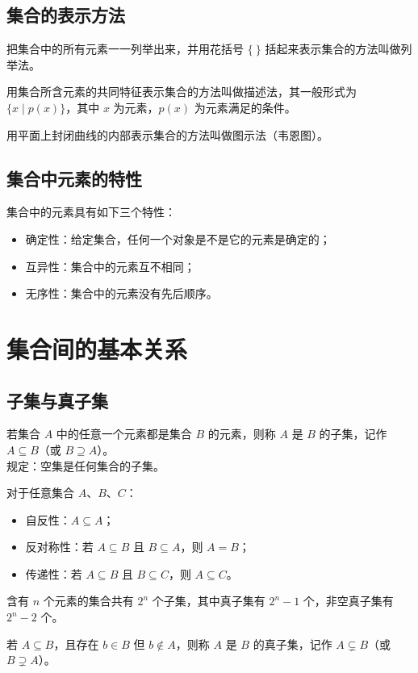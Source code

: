 \documentclass[lang=cn,newtx,10pt,scheme=chinese,nofont]{elegantbook}
\begin{document}
\subsection{集合的表示方法}
\begin{definition}[列举法]
把集合中的所有元素一一列举出来，并用花括号 $\{\ \}$ 括起来表示集合的方法叫做列举法。
\end{definition}
\begin{definition}[描述法]
用集合所含元素的共同特征表示集合的方法叫做描述法，其一般形式为 $\{x \mid p(x)\}$，其中 $x$ 为元素，$p(x)$ 为元素满足的条件。
\end{definition}
\begin{definition}[图示法]
用平面上封闭曲线的内部表示集合的方法叫做图示法（韦恩图）。
\end{definition}
\subsection{集合中元素的特性}
\begin{definition}
集合中的元素具有如下三个特性：
\begin{itemize}
    \item 确定性：给定集合，任何一个对象是不是它的元素是确定的；
    \item 互异性：集合中的元素互不相同；
    \item 无序性：集合中的元素没有先后顺序。
\end{itemize}
\end{definition}

\section{集合间的基本关系}
\subsection{子集与真子集}
\begin{definition}[子集]
若集合 $A$ 中的任意一个元素都是集合 $B$ 的元素，则称 $A$ 是 $B$ 的子集，记作 $A \subseteq B$（或 $B \supseteq A$）。\\
规定：空集是任何集合的子集。
\end{definition}
\begin{theorem}[子集的性质]
对于任意集合 $A$、$B$、$C$：
\begin{itemize}
    \item 自反性：$A \subseteq A$；
    \item 反对称性：若 $A \subseteq B$ 且 $B \subseteq A$，则 $A=B$；
    \item 传递性：若 $A \subseteq B$ 且 $B \subseteq C$，则 $A \subseteq C$。
\end{itemize}
\end{theorem}
\begin{corollary}[子集个数]
含有 $n$ 个元素的集合共有 $2^n$ 个子集，其中真子集有 $2^n-1$ 个，非空真子集有 $2^n-2$ 个。
\end{corollary}
\begin{definition}[真子集]
若 $A \subseteq B$，且存在 $b \in B$ 但 $b \notin A$，则称 $A$ 是 $B$ 的真子集，记作 $A \subsetneq B$（或 $B \supsetneq A$）。
\end{definition}
\end{document}

